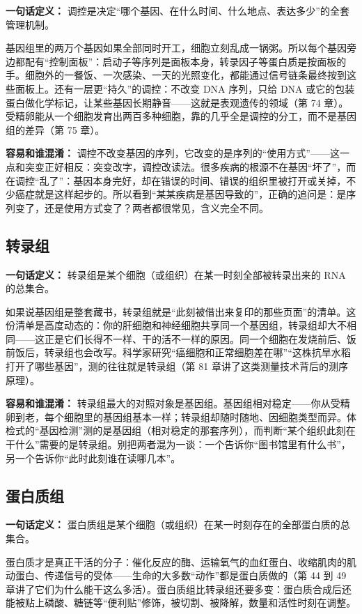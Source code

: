 \textbf{一句话定义：} 调控是决定“哪个基因、在什么时间、什么地点、表达多少”的全套管理机制。

基因组里的两万个基因如果全部同时开工，细胞立刻乱成一锅粥。所以每个基因旁边都配有“控制面板”：启动子等序列是面板本身，转录因子等蛋白质是按面板的手。细胞外的一餐饭、一次感染、一天的光照变化，都能通过信号链条最终按到这些面板上。还有一层更“持久”的调控：不改变 DNA 序列，只给 DNA 或它的包装蛋白做化学标记，让某些基因长期静音——这就是表观遗传的领域（第 74 章）。受精卵能从一个细胞发育出两百多种细胞，靠的几乎全是调控的分工，而不是基因组的差异（第 75 章）。

\textbf{容易和谁混淆：} 调控不改变基因的序列，它改变的是序列的“使用方式”——这一点和突变正好相反：突变改字，调控改读法。很多疾病的根源不在基因“坏了”，而在调控“乱了”：基因本身完好，却在错误的时间、错误的组织里被打开或关掉，不少癌症就是这样起步的。所以看到“某某疾病是基因导致的”，正确的追问是：是序列变了，还是使用方式变了？两者都很常见，含义完全不同。

\subsection{转录组}

\textbf{一句话定义：} 转录组是某个细胞（或组织）在某一时刻全部被转录出来的 RNA 的总集合。

如果说基因组是整套藏书，转录组就是“此刻被借出来复印的那些页面”的清单。这份清单是高度动态的：你的肝细胞和神经细胞共享同一个基因组，转录组却大不相同——这正是它们长得不一样、干的活不一样的原因。同一个细胞在发烧前后、饭前饭后，转录组也会改写。科学家研究“癌细胞和正常细胞差在哪”“这株抗旱水稻打开了哪些基因”，测的往往就是转录组（第 81 章讲了这类测量技术背后的测序原理）。

\textbf{容易和谁混淆：} 转录组最大的对照对象是基因组。基因组相对稳定——你从受精卵到老，每个细胞里的基因组基本一样；转录组却随时随地、因细胞类型而异。体检式的“基因检测”测的是基因组（相对稳定的那套序列），而判断“某个组织此刻在干什么”需要的是转录组。别把两者混为一谈：一个告诉你“图书馆里有什么书”，另一个告诉你“此时此刻谁在读哪几本”。

\subsection{蛋白质组}

\textbf{一句话定义：} 蛋白质组是某个细胞（或组织）在某一时刻存在的全部蛋白质的总集合。

蛋白质才是真正干活的分子：催化反应的酶、运输氧气的血红蛋白、收缩肌肉的肌动蛋白、传递信号的受体——生命的大多数“动作”都是蛋白质做的（第 44 到 49 章讲了它们为什么能干这么多活）。蛋白质组比转录组还要多变：蛋白质合成后还能被贴上磷酸、糖链等“便利贴”修饰，被切割、被降解，数量和活性时刻在调整。

